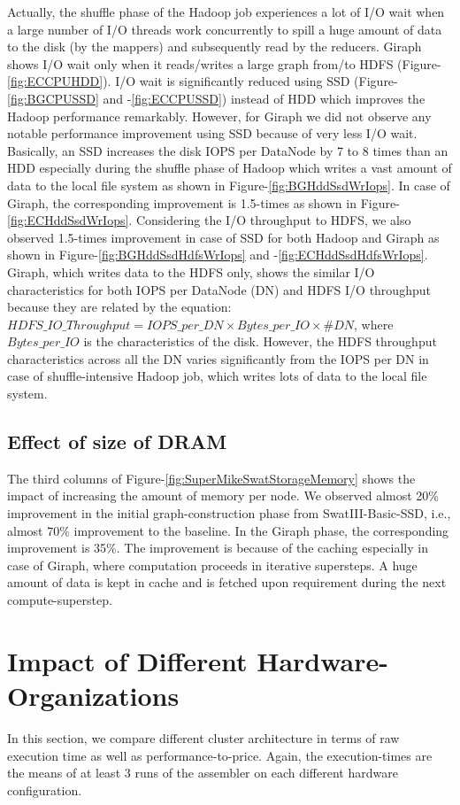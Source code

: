 \documentclass[conference]{IEEEtran}
\begin{document}
Actually, the shuffle phase of the Hadoop job experiences a lot of I/O wait when a large number of I/O threads work concurrently to spill a huge amount of data to the disk (by the mappers) and subsequently read by the reducers. Giraph shows I/O wait only when it reads/writes a large graph from/to HDFS (Figure-\ref{fig:ECCPUHDD}). I/O wait is significantly reduced using SSD (Figure-\ref{fig:BGCPUSSD} and -\ref{fig:ECCPUSSD}) instead of HDD which improves the Hadoop performance remarkably. However, for Giraph we did not observe any notable performance improvement using SSD because of very less I/O wait. Basically, an SSD increases the disk IOPS per DataNode by 7 to 8 times than an HDD especially during the shuffle phase of Hadoop which writes a vast amount of data to the local file system as shown in Figure-\ref{fig:BGHddSsdWrIops}. In case of Giraph, the corresponding improvement is 1.5-times as shown in Figure-\ref{fig:ECHddSsdWrIops}. Considering the I/O throughput to HDFS, we also observed 1.5-times improvement in case of SSD for both Hadoop and Giraph as shown in Figure-\ref{fig:BGHddSsdHdfsWrIops} and -\ref{fig:ECHddSsdHdfsWrIops}. Giraph, which writes data to the HDFS only, shows the similar I/O characteristics  for both IOPS per DataNode (DN) and HDFS I/O throughput because they are related by the equation: $HDFS\_IO\_Throughput = IOPS\_per\_DN \times Bytes\_per\_IO \times \#DN$, where $Bytes\_per\_IO$ is the characteristics of the disk.  However, the HDFS throughput characteristics across all the DN varies significantly from the IOPS per DN in case of shuffle-intensive Hadoop job, which writes lots of data to the local file system.

\subsection {Effect of size of DRAM} \label{EffectOfDRAM}
The third columns of Figure-\ref{fig:SuperMikeSwatStorageMemory} shows the impact of increasing the amount of memory per node. 
We observed almost 20\% improvement in the initial graph-construction phase from SwatIII-Basic-SSD, i.e., almost 70\% improvement to the baseline. In the Giraph phase, the corresponding improvement is 35\%. The improvement is because of the caching especially in case of Giraph, where computation proceeds in iterative supersteps. A huge amount of data is kept in cache and is fetched upon requirement during the next compute-superstep.

\section {Impact of Different Hardware-Organizations} \label{ComparingDifferentArchitecturalBalance}
In this section, we compare different cluster architecture in terms of raw execution time as well as performance-to-price. Again, the execution-times are the means of at least 3 runs of the assembler on each different hardware configuration.
\end{document}
